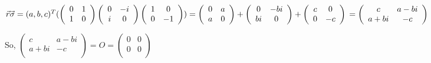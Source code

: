 \documentclass{article}
\begin{document}
\begin{enumerate}
          $\vec{r}\vec{\sigma}
              \\=(a,b,c)^T(\left(
              \begin{array}{cc}
                      0 & 1 \\1&0\\
                  \end{array}
              \right)\left(
              \begin{array}{cc}
                      0 & -i \\i&0\\
                  \end{array}
              \right)\left(
              \begin{array}{cc}
                      1 & 0 \\0&-1\\
                  \end{array}
              \right))
              \\=\left(
              \begin{array}{cc}
                      0 & a \\a&0\\
                  \end{array}
              \right)+\left(
              \begin{array}{cc}
                      0 & -bi \\bi&0\\
                  \end{array}
              \right)+\left(
              \begin{array}{cc}
                      c & 0 \\0&-c\\
                  \end{array}
              \right)
              \\=\left(
              \begin{array}{cc}
                      c & a-bi \\a+bi&-c\\
                  \end{array}
              \right)
          $

          So, $\left(
              \begin{array}{cc}
                      c & a-bi \\a+bi&-c\\
                  \end{array}
              \right)=O=\left(
              \begin{array}{cc}
                      0 & 0 \\0&0\\
                  \end{array}
              \right)$


\end{enumerate}
\end{document}

